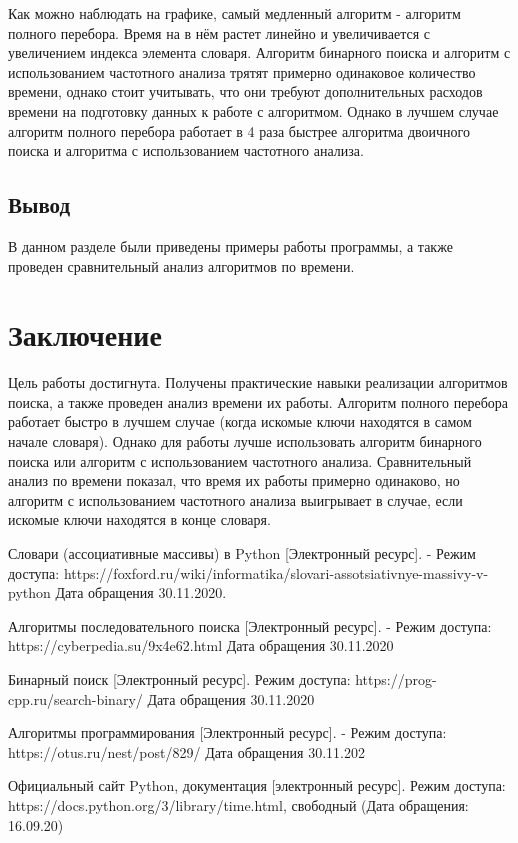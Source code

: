 \documentclass[12pt]{report}
\begin{document}
Как можно наблюдать на графике, самый медленный алгоритм - алгоритм полного перебора. Время на в нём растет линейно и увеличивается с увеличением индекса элемента словаря. Алгоритм бинарного
поиска и алгоритм с использованием частотного анализа трятят примерно одинаковое количество времени, однако стоит учитывать, что они требуют дополнительных расходов времени на подготовку данных к работе с алгоритмом.
Однако в лучшем случае алгоритм полного перебора работает в 4 раза быстрее алгоритма двоичного поиска и алгоритма с использованием частотного анализа.

\newpage
\section{Вывод}
В данном разделе были приведены примеры работы программы, а также проведен сравнительный анализ алгоритмов по времени.

\newpage
\chapter*{Заключение}
Цель работы достигнута. Получены практические навыки реализации алгоритмов поиска, а также проведен анализ времени их работы. Алгоритм полного перебора работает быстро в лучшем случае (когда искомые ключи находятся в самом начале словаря). Однако для работы лучше использовать алгоритм бинарного поиска или алгоритм с использованием частотного анализа. Сравнительный анализ по времени показал, что время их работы примерно одинаково, но алгоритм с использованием частотного анализа выигрывает в случае, если искомые ключи находятся в конце словаря.


\begin{thebibliography}{2}
	
	 Словари (ассоциативные массивы) в Python [Электронный ресурс]. - Режим доступа: https://foxford.ru/wiki/informatika/slovari-assotsiativnye-massivy-v-python Дата обращения 30.11.2020.
	
	 Алгоритмы последовательного поиска [Электронный ресурс]. - Режим доступа: https://cyberpedia.su/9x4e62.html Дата обращения 30.11.2020
	
	 Бинарный поиск [Электронный ресурс]. Режим доступа: https://prog-cpp.ru/search-binary/ Дата обращения 30.11.2020
	
	 Алгоритмы программирования [Электронный ресурс]. - Режим доступа: https://otus.ru/nest/post/829/ Дата обращения 30.11.202
	
	 Официальный сайт Python, документация [электронный ресурс]. Режим доступа: https://docs.python.org/3/library/time.html, свободный (Дата обращения: 16.09.20)
	
\end{thebibliography}
\end{document}
